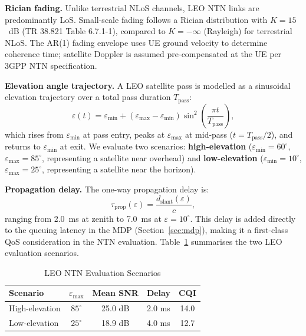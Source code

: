 \documentclass[conference]{IEEEtran}
\begin{document}
\textbf{Rician fading.}
Unlike terrestrial NLoS channels, LEO NTN links are predominantly LoS.
Small-scale fading follows a Rician distribution with
$K = 15$~dB (TR 38.821 Table 6.7.1-1), compared to $K = -\infty$ (Rayleigh)
for terrestrial NLoS.
The AR(1) fading envelope uses UE ground velocity to determine coherence time;
satellite Doppler is assumed pre-compensated at the UE per 3GPP NTN specification.

\textbf{Elevation angle trajectory.}
A LEO satellite pass is modelled as a sinusoidal elevation trajectory
over a total pass duration $T_{\mathrm{pass}}$:
\begin{equation}
  \varepsilon(t) = \varepsilon_{\min}
    + (\varepsilon_{\max} - \varepsilon_{\min})
      \sin^2\!\!\left(\frac{\pi t}{T_{\mathrm{pass}}}\right),
  \label{eq:elevation}
\end{equation}
which rises from $\varepsilon_{\min}$ at pass entry, peaks at
$\varepsilon_{\max}$ at mid-pass ($t = T_{\mathrm{pass}}/2$),
and returns to $\varepsilon_{\min}$ at exit.
We evaluate two scenarios: \textbf{high-elevation}
($\varepsilon_{\min} = 60^\circ$, $\varepsilon_{\max} = 85^\circ$,
representing a satellite near overhead) and \textbf{low-elevation}
($\varepsilon_{\min} = 10^\circ$, $\varepsilon_{\max} = 25^\circ$,
representing a satellite near the horizon).

\textbf{Propagation delay.}
The one-way propagation delay is:
\begin{equation}
  \tau_{\mathrm{prop}}(\varepsilon) = \frac{d_{\mathrm{slant}}(\varepsilon)}{c},
  \label{eq:prop_delay}
\end{equation}
ranging from 2.0~ms at zenith to 7.0~ms at $\varepsilon = 10^\circ$.
This delay is added directly to the queuing latency in the MDP
(Section~\ref{sec:mdp}), making it a first-class QoS consideration
in the NTN evaluation.
Table~\ref{tab:ntn_scenarios} summarises the two LEO evaluation scenarios.

\begin{table}[t]
  \centering
  \caption{LEO NTN Evaluation Scenarios}
  \label{tab:ntn_scenarios}
  \begin{tabular}{lcccc}
    \toprule
    Scenario & $\varepsilon_{\max}$ & Mean SNR & Delay & CQI \\
    \midrule
    High-elevation & $85^\circ$ & 25.0 dB & 2.0 ms & 14.0 \\
    Low-elevation  & $25^\circ$ & 18.9 dB & 4.0 ms & 12.7 \\
    \bottomrule
  \end{tabular}
\end{table}
\end{document}

